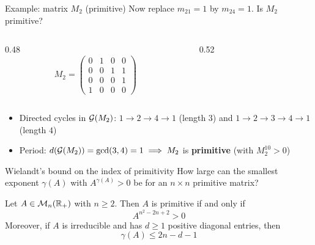 \documentclass[aspectratio=169]{beamer}\usepackage[]{graphicx}\usepackage[]{xcolor}
\begin{document}
\begin{frame}{Example: matrix $M_2$ (primitive)}
Now replace $m_{21} = 1$ by $m_{24} = 1$. Is $M_2$ primitive?
\vfill
\begin{columns}[c]
\begin{column}{0.48\textwidth}
\[
M_2 = \begin{pmatrix}
0 & 1 & 0 & 0 \\
0 & 0 & 1 & 1 \\
0 & 0 & 0 & 1 \\
1 & 0 & 0 & 0
\end{pmatrix}
\]
\end{column}
\begin{column}{0.52\textwidth}
\centering
{}
\end{column}
\end{columns}
\vfill
\begin{itemize}
\item Directed cycles in $\mathcal{G}(M_2)$: $1 \to 2 \to 4 \to 1$ (length $3$) and $1 \to 2 \to 3 \to 4 \to 1$ (length $4$)
\item Period: $d(\mathcal{G}(M_2)) = \gcd(3, 4) = 1 \implies M_2$ is \textbf{primitive} (with $M_2^{10} > 0$)
\end{itemize}
\end{frame}

\begin{frame}{Wielandt's bound on the index of primitivity}
How large can the smallest exponent $\gamma(A)$ with $A^{\gamma(A)} > 0$ be for an $n \times n$ primitive matrix?
\vfill
\begin{theorem}
\label{th:wielandt}
Let $A \in \mathcal{M}_n(\mathbb{R}_+)$ with $n \ge 2$. Then $A$ is primitive if and only if
\[
A^{n^2 - 2n + 2} > 0
\]
Moreover, if $A$ is irreducible and has $d \ge 1$ positive diagonal entries, then
\[
\gamma(A) \le 2n - d - 1
\]
\end{theorem}
\end{frame}
\end{document}
